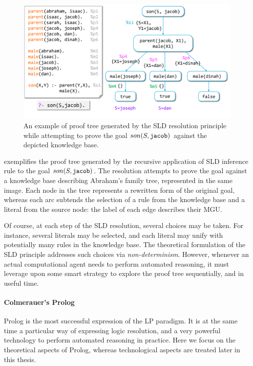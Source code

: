 \documentclass[12pt,a4paper,openright,twoside]{book}
\begin{document}
\begin{figure}
    \centering
    \includegraphics[width=\linewidth]{figures/proof-tree.png}
    \caption[An example of proof tree generated by the SLD resolution principle]{An example of proof tree generated by the SLD resolution principle while attempting to prove the goal $son(S, \mathtt{jacob})$ against the depicted knowledge base. }
    \label{fig:proof-tree}
\end{figure}

 exemplifies the proof tree generated by the recursive application of SLD inference rule to the goal $son(S, \mathtt{jacob})$.
%
The resolution attempts to prove the goal against a knowledge base describing Abraham's family tree, represented in the same image.
%
Each node in the tree represents a rewritten form of the original goal, whereas each arc subtends the selection of a rule from the knowledge base and a literal from the source node: the label of each edge describes their MGU.

Of course, at each step of the SLD resolution, several choices may be taken.
%
For instance, several literals may be selected, and each literal may unify with potentially many rules in the knowledge base.
%
The theoretical formulation of the SLD principle addresses such choices via \emph{non-determinism}.
%
However, whenever an actual computational agent needs to perform automated reasoning, it must leverage upon some smart strategy to explore the proof tree sequentially, and in useful time.

\paragraph{Colmerauer's Prolog}

Prolog \cite{ColmerauerR93} is the most successful expression of the LP paradigm.
%
It is at the same time a particular way of expressing logic resolution, and a very powerful technology to perform automated reasoning in practice.
%
Here we focus on the theoretical aspects of Prolog, whereas technological aspects are treated later in this thesis.
\end{document}
